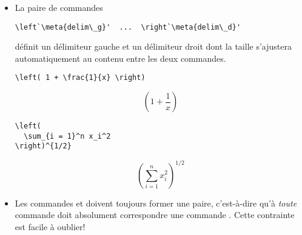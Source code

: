 \begin{itemize}
\item La paire de commandes
\begin{lstlisting}
\left`\meta{delim\_g}'  ...  \right`\meta{delim\_d}'
\end{lstlisting}
  définit un délimiteur gauche  et un délimiteur droit
   dont la taille s'ajustera automatiquement au contenu
  entre les deux commandes.
  \begin{demo}
    \begin{texample}
\begin{lstlisting}
\left( 1 + \frac{1}{x} \right)
\end{lstlisting}
      \producing
      \begin{equation*}
        \left( 1 + \frac{1}{x} \right)
      \end{equation*}
    \end{texample}

    \begin{texample}
\begin{lstlisting}
\left(
  \sum_{i = 1}^n x_i^2
\right)^{1/2}
\end{lstlisting}
      \producing
      \begin{equation*}
        \left(
          \sum_{i = 1}^n x_i^2
        \right)^{1/2}
      \end{equation*}
    \end{texample}
  \end{demo}
\item Les commandes \cmd{\left} et \cmd{\right} doivent toujours
  former une paire, c'est-à-dire qu'à \emph{toute} commande
  \cmdprint{\left} doit absolument correspondre une commande
    \cmdprint{\right}. Cette contrainte est facile à oublier!


\end{itemize}
